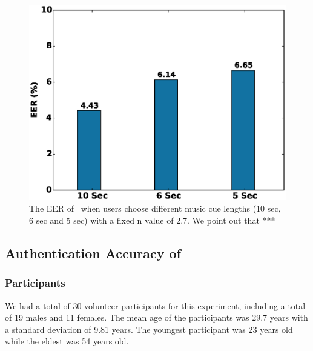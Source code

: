 
\begin{figure}[t]
\centering
\includegraphics [width=.75\columnwidth]{figure/exp2_eer_vary_length.eps}
\caption{The EER of \systemname~when users choose different music cue lengths (10 sec, 6 sec and 5
sec) with a fixed n value of 2.7. We point out that ***}
\label{fig:eer-length}
\end{figure}




\subsection{Authentication Accuracy of \systemname}

\subsubsection{Participants}
We had a total of 30 volunteer participants for this experiment, including a total of 19 males and 11 females.
The mean age of the participants was 29.7 years with a standard deviation
of 9.81 years. The youngest participant was 23 years old while the eldest was
54 years old.


